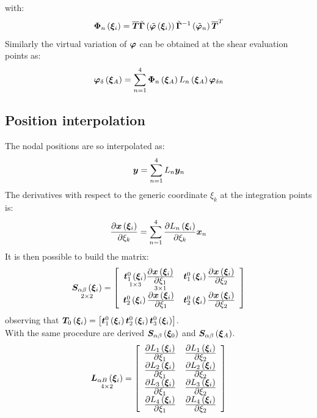 with:
\begin{equation}
\T{ \Phi }_n \valxii =
\overline{ \TT{T} } \tilde{\TT{\Gamma}} \plbr{ \tilde{ \T{\varphi}}  \valxii }  \tilde{\TT{\Gamma}} ^ {-1} \plbr{ \tilde{ \T{\varphi} }_n } \overline{ \TT{T} } ^ T
\end{equation}
Similarly the virtual variation of $\T{\varphi}$ can be obtained at the shear evaluation points as:
\begin{equation}
\T{ \varphi }_{\delta} \valxiA =
\sum_{ n = 1 }^{ 4 } \T{ \Phi }_n \valxiA L_n \valxiA \T{\varphi}_{\delta n}
\end{equation}
\subsection{Position interpolation}
The nodal positions are so interpolated as:
\begin{equation}
\T{ y }   = \sum_{ n = 1 }^4  L_n   \T{ y }_n
\end{equation}
The derivatives with respect to the generic coordinate $\xi_k$ at the integration points is:
\begin{equation}
\fracdp{ \T{ x } \valxii }{ \xi_k }  = \sum_{ n = 1 }^4 \fracdp{ L_n \valxii }{ \xi_k } \T{ x }_n
\end{equation}
It is then possible to build the matrix:
\begin{equation}
\underset{ 2 \times 2 }{ \TT{S}_{ \alpha \beta } \valxii } =
\sqbr{ \matr{ c  c  }{
\underset{ 1 \times 3 }{ \T{ t }_{1}^{0} \valxii } \underset{ 3 \times 1 }{ \fracdp{ \T{x} \valxii }{ \xi_1 } } & \T{ t }_{1}^{0} \valxii \fracdp{ \T{x} \valxii }{ \xi_2 } \\
\T{ t }_{2}^{0} \valxii \fracdp{ \T{x} \valxii }{ \xi_1 } & \T{ t }_{2}^{0} \valxii \fracdp{ \T{x} \valxii }{ \xi_2 }
}}
\end{equation}
observing that $\TT{T}_0 \valxii = \sqbr{ \T{t}_{1}^{0} \valxii  \T{t}_{2}^{0} \valxii \T{t}_{3}^{0} \valxii }$.\\
With the same procedure are derived $\TT{S}_{ \alpha \beta } \valxio$ and  $\TT{S}_{ \alpha \beta } \valxiA$.\\
\begin{equation}
\underset{ 4 \times 2 } { \TT{L}_{ \alpha B } \valxii } =
\sqbr{ \matr{ c c }{
\fracdp{ L_1 \valxii }{ \xi_1 } & \fracdp{ L_1 \valxii }{ \xi_2 } \\
\fracdp{ L_2 \valxii }{ \xi_1 } & \fracdp{ L_2 \valxii }{ \xi_2 } \\
\fracdp{ L_3 \valxii }{ \xi_1 } & \fracdp{ L_3 \valxii }{ \xi_2 } \\
\fracdp{ L_4 \valxii }{ \xi_1 } & \fracdp{ L_4 \valxii }{ \xi_2 } \\
}}
\end{equation}
